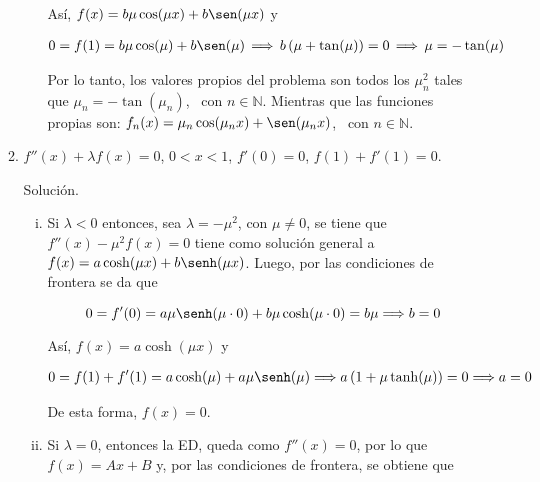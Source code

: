 \documentclass[fleqn]{article}
\newcommand{\nat}{\mathbb{N}}
\begin{document}
\begin{enumerate}[I.]
\begin{enumerate}
\begin{enumerate}[i)]
				Así, $ f(x) = b \mu \cos(\mu x) + b \sen(\mu x) $ y 

				\begin{align*}
					0 = f(1) = b \mu \cos(\mu) + b \sen(\mu) \, \Longrightarrow \, b \left( \mu + \tan(\mu) \right) = 0 \, \Longrightarrow \, \mu = - \tan (\mu)
				\end{align*}
				
				Por lo tanto, los valores propios del problema son todos los $ \mu_n^2 $ tales que $ \mu_n = - \tan (\mu_n) $, \, con $ n \in \nat $. Mientras que las funciones propias son: $ f_n (x) = \mu_n \cos(\mu_n x) + \sen(\mu_n x) $, \, con $ n \in \nat $.
			\end{enumerate} \vspace{3mm}


			\bfseries
			
			\item $ f''(x) + \lambda f(x) = 0 $, $ 0 < x < 1 $, $ f'(0) = 0 $, $ f(1) + f'(1) = 0 $.
			
			Solución.
			
			\normalfont

			\begin{enumerate}[i)]
				\item Si $ \lambda < 0 $ entonces, sea $ \lambda = - \mu^2 $, con $ \mu \neq 0 $, se tiene que $ f''(x) - \mu^2 f(x) = 0 $
				tiene como solución general a $ f(x) = a \cosh(\mu x) + b \senh(\mu x) $. Luego, por las condiciones de frontera se da que
				
				\begin{equation*}
					0 = f'(0) = a \mu \senh(\mu \cdot 0) + b \mu \cosh(\mu \cdot 0) = b \mu \Longrightarrow b = 0 
				\end{equation*}

				Así, $ f(x) = a \cosh(\mu x) $ y 

				\begin{align*}
					0 = f(1) + f'(1) = a \cosh(\mu) + a \mu \senh(\mu) \Longrightarrow a \left( 1 + \mu \tanh(\mu) \right) = 0 \Longrightarrow a = 0
				\end{align*}
				
				De esta forma, $ f(x) = 0 $.

				\item Si $ \lambda = 0 $, entonces la ED, queda como $ f''(x) = 0 $, por lo que $ f(x) = Ax + B $ y, por las condiciones de frontera, se obtiene que 
				

\end{enumerate}
\end{enumerate}
\end{enumerate}
\end{document}

